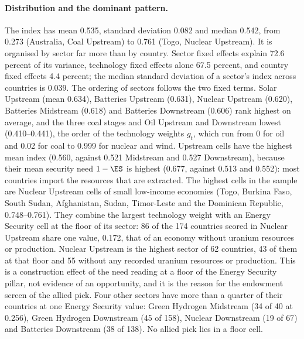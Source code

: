 \paragraph{Distribution and the dominant pattern.} The index has mean 0.535, standard deviation
0.082 and median 0.542, from 0.273 (Australia, Coal Upstream) to 0.761 (Togo, Nuclear Upstream).
It is organised by sector far more than by country. Sector fixed effects explain 72.6 percent of
its variance, technology fixed effects alone 67.5 percent, and country fixed effects 4.4 percent;
the median standard deviation of a sector's index across countries is 0.039. The ordering of
sectors follows the two fixed terms. Solar Upstream (mean 0.634), Batteries Upstream (0.631),
Nuclear Upstream (0.620), Batteries Midstream (0.618) and Batteries Downstream (0.606) rank highest
on average, and the three coal stages and Oil Upstream and Downstream lowest (0.410--0.441), the
order of the technology weights $g_t$, which run from 0 for oil and 0.02 for coal to 0.999 for
nuclear and wind. Upstream cells have the highest mean index (0.560, against 0.521 Midstream and
0.527 Downstream), because their mean security need $1-\ES$ is highest (0.677, against 0.513 and
0.552): most countries import the resources that are extracted. The highest cells in the sample
are Nuclear Upstream cells of small low-income economies (Togo, Burkina Faso, South Sudan,
Afghanistan, Sudan, Timor-Leste and the Dominican Republic, 0.748--0.761). They combine the largest
technology weight with an Energy Security cell at the floor of its sector: 86 of the 174 countries
scored in Nuclear Upstream share one value, 0.172, that of an economy without uranium resources or
production. Nuclear Upstream is the highest sector of 62 countries, 43 of them at that floor and 55
without any recorded uranium resources or production. This is a construction effect of the need
reading at a floor of the Energy Security pillar, not evidence of an opportunity, and it is the
reason for the endowment screen of the allied pick. Four other sectors have more than a quarter of
their countries at one Energy Security value: Green Hydrogen Midstream (34 of 40 at 0.256), Green
Hydrogen Downstream (45 of 158), Nuclear Downstream (19 of 67) and Batteries Downstream (38 of
138). No allied pick lies in a floor cell.

